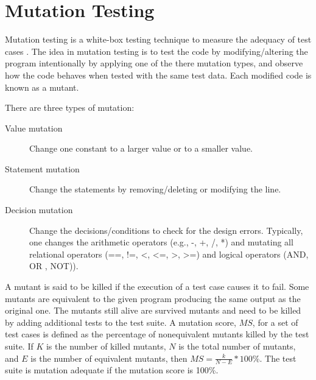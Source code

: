 \section{Mutation Testing}
Mutation testing is a white-box testing technique to measure the adequacy of test cases \autocite{demillo1978hints}. The idea in mutation testing is to test the code by modifying/altering the program intentionally by applying one of the there mutation types, and observe how the code behaves when tested with the same test data.  Each modified code is known as a mutant.

There are three types of mutation:
\begin{description}
    \item[Value mutation] Change one constant to a larger value or to a smaller value.
    \item[Statement mutation] Change the statements by removing/deleting or modifying the line.
    \item[Decision mutation] Change the decisions/conditions to check for the design errors. Typically, one changes the arithmetic operators (e.g., -, +, /, *) and mutating all relational operators (==, !=, <, <=, >, >=) and logical operators (AND, OR , NOT)).
\end{description}

A mutant is said to be killed if the execution of a test case causes it to fail. Some mutants are equivalent to the given program producing the same output as the original one. The mutants still alive are survived mutants and need to be killed by adding additional tests to the test suite. A mutation score, $MS$, for a set of test cases is defined as the percentage of nonequivalent mutants killed by the test suite. If $K$ is the number of killed mutants, $N$ is the total number of mutants, and $E$ is the number of equivalent mutants, then $MS = \frac{k}{N - E} * 100\%$. The test suite is mutation adequate if the mutation score is 100\%.

